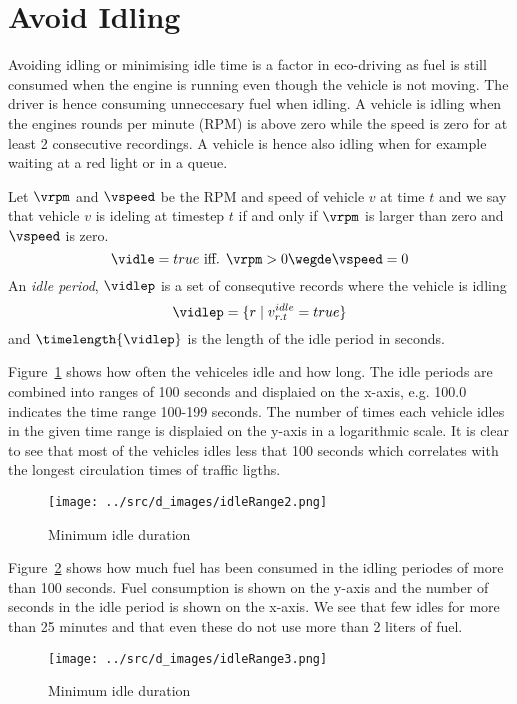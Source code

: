 \section{Avoid Idling}

Avoiding idling or minimising idle time is a factor in eco-driving as fuel is still consumed when the engine is running even though the vehicle is not moving.
The driver is hence consuming unneccesary fuel when idling.
A vehicle is idling when the engines rounds per minute (RPM) is above zero while the speed is zero for at least 2 consecutive recordings.
A vehicle is hence also idling when for example waiting at a red light or in a queue. 

Let $\vrpm$ and $\vspeed$ be the RPM and speed of vehicle $v$ at time $t$ and we say that vehicle $v$ is ideling at timestep $t$ if and only if $\vrpm$ is larger than zero and $\vspeed$ is zero.
\[\vidle = true \mbox{ iff. } \vrpm > 0 \wegde \vspeed = 0\]
An \textit{idle period}, $\vidlep$ is a set of consequtive records where the vehicle is idling
\[\vidlep = \{r \mid v_{r.t}^{idle}=true \}\]
and $\timelength{\vidlep}$ is the length of the idle period in seconds.

Figure~\ref{fig:idleRange2} shows how often the vehiceles idle and how long.
The idle periods are combined into ranges of 100 seconds and displaied on the x-axis, e.g. 100.0 indicates the time range 100-199 seconds. 
The number of times each vehicle idles in the given time range is displaied on the y-axis in a logarithmic scale. 
It is clear to see that most of the vehicles idles less that 100 seconds which correlates with the longest circulation times of traffic ligths. 
\begin{figure}[htb]
\centering
\texttt{[image: ../src/d\_images/idleRange2.png]}
\caption{Minimum idle duration}
\label{fig:idleRange2}
\end{figure}

Figure~\ref{fig:idleRange3} shows how much fuel has been consumed in the idling periodes of more than 100 seconds. 
Fuel consumption is shown on the y-axis and the number of seconds in the idle period is shown on the x-axis.
We see that few idles for more than 25 minutes and that even these do not use more than 2 liters of fuel.
\begin{figure}[htb]
\centering
\texttt{[image: ../src/d\_images/idleRange3.png]}
\caption{Minimum idle duration}
\label{fig:idleRange3}
\end{figure}

